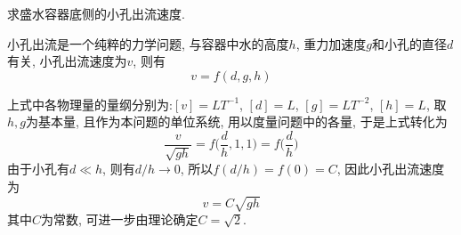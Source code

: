 \begin{problem}[09]
求盛水容器底侧的小孔出流速度.
\end{problem}
\begin{solution}
\begin{minipage}[c]{0.8\linewidth}
小孔出流是一个纯粹的力学问题, 与容器中水的高度$h$, 重力加速度$g$和小孔的直径$d$有关, 小孔出流速度为$v$, 则有
\[
v = f(d, g, h)
\]
\end{minipage}
\begin{minipage}[c]{0.2\linewidth}
\begin{center}

\end{center}
\end{minipage}
上式中各物理量的量纲分别为:$[v]=LT^{-1}$, $[d]=L$, $[g]=LT^{-2}$, $[h]=L$, 取$h,g$为基本量, 且作为本问题的单位系统, 用以度量问题中的各量, 于是上式转化为
\[
\frac{v}{\sqrt{gh}}=f\bigg(\frac{d}{h},1,1\bigg)=f\bigg(\frac{d}{h}\bigg)
\]
由于小孔有$d\ll h$, 则有$d/h\rightarrow 0$, 所以$f(d/h)=f(0)=C$, 因此小孔出流速度为
\[
v = C\sqrt{gh}
\]
其中$C$为常数, 可进一步由理论确定$C=\sqrt{2}$.
\end{solution}
